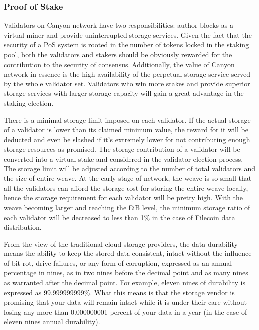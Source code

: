 \documentclass[]{article}
\newcounter{subsubsubsection}[subsubsection]
\begin{document}
\subsubsection{Proof of Stake}


Validators on Canyon network have two responsibilities: author blocks as a virtual miner and provide uninterrupted storage services. Given the fact that the security of a PoS system is rooted in the number of tokens locked in the staking pool, both the validators and stakers should be obviously rewarded for the contribution to the security of consensus. Additionally, the value of Canyon network in essence is the high availability of the perpetual storage service served by the whole validator set. Validators who win more stakes and provide superior storage services with larger storage capacity will gain a great advantage in the staking election.

There is a minimal storage limit imposed on each validator. If the actual storage of a validator is lower than its claimed minimum value, the reward for it will be deducted and even be slashed if it's extremely lower for not contributing enough storage resources as promised. The storage contribution of a validator will be converted into a virtual stake and considered in the validator election process. The storage limit will be adjusted according to the number of total validators and the size of entire weave. At the early stage of network, the weave is so small that all the validators can afford the storage cost for storing the entire weave locally, hence the storage requirement for each validator will be pretty high. With the weave becoming larger and reaching the EiB level, the minimum storage ratio of each validator will be decreased to less than 1\% in the case of Filecoin data distribution.

\label{data_durability}

From the view of the traditional cloud storage providers, the data durability means the ability to keep the stored data consistent, intact without the influence of bit rot, drive failures, or any form of corruption, expressed as an annual percentage in nines, as in two nines before the decimal point and as many nines as warranted after the decimal point. For example, eleven nines of durability is expressed as 99.999999999\%. What this means is that the storage vendor is promising that your data will remain intact while it is under their care without losing any more than 0.000000001 percent of your data in a year (in the case of eleven nines annual durability)\cite{storagedurability}.
\end{document}
